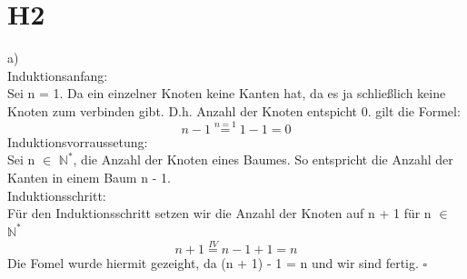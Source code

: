 \documentclass{article}
\begin{document}
\section{H2}
\noindent a) \\ 
Induktionsanfang: \\ 
\indent Sei n = 1. Da ein einzelner Knoten keine Kanten hat, da es ja schließlich keine Knoten 
\indent zum verbinden gibt. D.h. Anzahl der Knoten entspicht 0.
gilt die Formel: 
\[
    n - 1 \overset{n = 1}{=} 1 - 1 = 0
\]
Induktionsvorraussetung: \\
\indent Sei n $\in$ $\mathds{N}^*$, die Anzahl der Knoten eines Baumes. So entspricht die Anzahl der Kanten
in einem Baum n - 1. \\ 
Induktionsschritt: \\ 
Für den Induktionsschritt setzen wir die Anzahl der Knoten auf n + 1 für n $\in$ $\mathds{N}^*$
\[
    n + 1 \overset{IV}{=} n - 1 + 1 = n
\]
Die Fomel wurde hiermit gezeight, da (n + 1) - 1 = n und wir sind fertig. \indent $\square$ 
\end{document}
